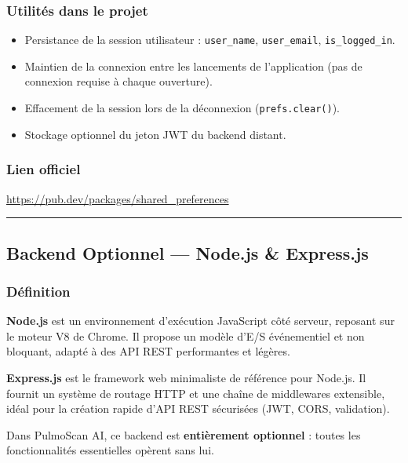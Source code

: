 \documentclass[12pt,a4paper]{report}
\begin{document}
\subsubsection*{Utilités dans le projet}
\begin{itemize}
  \item Persistance de la session utilisateur : \texttt{user\_name}, \texttt{user\_email}, \texttt{is\_logged\_in}.
  \item Maintien de la connexion entre les lancements de l'application (pas de connexion requise à chaque ouverture).
  \item Effacement de la session lors de la déconnexion (\texttt{prefs.clear()}).
  \item Stockage optionnel du jeton JWT du backend distant.
\end{itemize}

\subsubsection*{Lien officiel}
\url{https://pub.dev/packages/shared_preferences}

\medskip\hrule\medskip

\subsection{Backend Optionnel --- Node.js \& Express.js}

\noindent\begin{minipage}[t]{0.66\textwidth}
\subsubsection*{Définition}
\textbf{Node.js} est un environnement d'exécution JavaScript côté serveur, reposant sur le moteur V8 de Chrome. Il propose un modèle d'E/S événementiel et non bloquant, adapté à des API REST performantes et légères.

\textbf{Express.js} est le framework web minimaliste de référence pour Node.js. Il fournit un système de routage HTTP et une chaîne de middlewares extensible, idéal pour la création rapide d'API REST sécurisées (JWT, CORS, validation).

Dans PulmoScan AI, ce backend est \textbf{entièrement optionnel} : toutes les fonctionnalités essentielles opèrent sans lui.
\end{minipage}\hfill
\begin{minipage}[t]{0.30\textwidth}
\vspace{0pt}
\begin{center}
\end{center}
\end{minipage}
\end{document}
